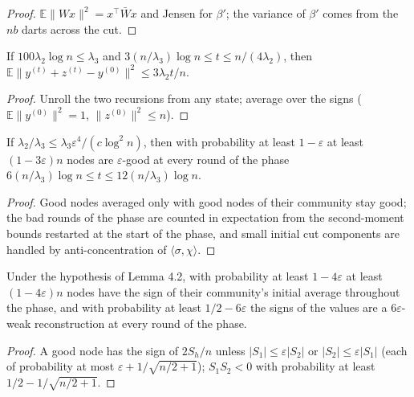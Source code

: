 \begin{proof}\leanok
$\mathbb E\|Wx\|^2=x^\top\bar Wx$ and Jensen for $\beta'$; the variance of $\beta'$ comes from the
$nb$ darts across the cut.
\end{proof}
\begin{theorem}\label{thm:opp-41}
\leanok{}
If $100\lambda_2\log n\le\lambda_3$ and $3(n/\lambda_3)\log n\le t\le n/(4\lambda_2)$, then
$\mathbb E\|y^{(t)}+z^{(t)}-y^{(0)}\|^2\le3\lambda_2t/n$.
\end{theorem}
\begin{proof}\leanok
Unroll the two recursions from any state; average over the signs ($\mathbb E\|y^{(0)}\|^2=1$,
$\|z^{(0)}\|^2\le n$).
\end{proof}
\begin{theorem}\label{thm:opp-42}
\leanok{}
If $\lambda_2/\lambda_3\le\lambda_3\varepsilon^4/(c\log^2n)$, then with probability at least
$1-\varepsilon$ at least $(1-3\varepsilon)n$ nodes are $\varepsilon$-good at every round of the
phase $6(n/\lambda_3)\log n\le t\le12(n/\lambda_3)\log n$.
\end{theorem}
\begin{proof}\leanok
Good nodes averaged only with good nodes of their community stay good; the bad rounds of the
phase are counted in expectation from the second-moment bounds restarted at the start of the
phase, and small initial cut components are handled by anti-concentration of $\langle\sigma,\chi\rangle$.
\end{proof}
\begin{theorem}\label{thm:opp-main}
\leanok{}
Under the hypothesis of Lemma 4.2, with probability at least $1-4\varepsilon$ at least
$(1-4\varepsilon)n$ nodes have the sign of their community's initial average throughout the
phase, and with probability at least $1/2-6\varepsilon$ the signs of the values are a
$6\varepsilon$-weak reconstruction at every round of the phase.
\end{theorem}
\begin{proof}\leanok
A good node has the sign of $2S_h/n$ unless $|S_1|\le\varepsilon|S_2|$ or $|S_2|\le\varepsilon|S_1|$
(each of probability at most $\varepsilon+1/\sqrt{n/2+1}$); $S_1S_2<0$ with probability at least
$1/2-1/\sqrt{n/2+1}$.
\end{proof}
